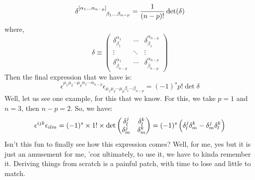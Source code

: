 $$\tensor{\delta}{^{[\alpha_1\ldots\alpha_{n-p}]} _{\beta_1\ldots\beta_{n-p}}} = \frac{1}{(n-p)!}\det(\mathrm{\delta})$$
where, $$\delta \equiv 
\begin{pmatrix}
\delta^{\alpha_1}_{\beta_1} & \cdots & \delta^{\alpha_{n-p}}_{\beta_1} \\
\vdots & \ddots & \vdots \\
\delta^{\alpha_1}_{\beta_{n-p}} & \cdots & \delta^{\alpha_{n-p}}_{\beta_{n-p}}
\end{pmatrix}$$
Then the final expression that we have is: 
$$\epsilon^{\mu_1 \mu_2 \cdots \mu_p \alpha_1 \cdots \alpha_{n-p}} 
\epsilon_{\mu_1 \mu_2 \cdots \mu_p \beta_1 \cdots \beta_{n-p}} 
= (-1)^s p! \det{\delta}$$
Well, let us see one example, for this that we know. For this, we take $p=1$ and $n=3$, then $n-p = 2$. So, we have:
$$\epsilon^{ijk}\epsilon_{ilm} = (-1)^s \times 1! \times \det\begin{pmatrix}
    \delta^j_l &  \delta^k_l \\
     \delta^j_m &  \delta^k_m
\end{pmatrix} = (-1)^s \left( \delta^j_l \delta^k_m - \delta^j_m \delta^k_l \right)$$
Isn't this fun to finally see how this expression comes? Well, for me, yes but it is just an amusement for me, 'coz ultimately, to use it, we have to kinda remember it. Deriving things from scratch is a painful patch, with time to lose and little to match. 
